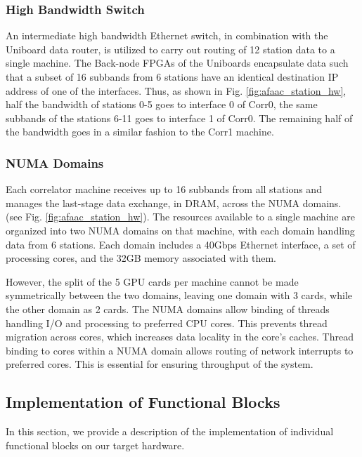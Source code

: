 \documentclass{ws-jai}
\begin{document}
\subsubsection  {High  Bandwidth  Switch}
An intermediate high bandwidth Ethernet switch, in combination with the Uniboard
data router,  is utilized to carry  out routing of  12 station data to  a single
machine.  The  Back-node FPGAs  of the  Uniboards encapsulate  data such  that a
subset of 16  subbands from 6 stations have an  identical destination IP address
of one of  the interfaces.  Thus, as shown  in Fig.  \ref{fig:afaac_station_hw},
half  the bandwidth  of stations  0-5 goes  to interface  0 of  Corr0, the  same
subbands of the stations 6-11 goes to  interface 1 of Corr0.  The remaining half
of the bandwidth goes in a similar fashion to the Corr1 machine.\\

\subsubsection  {NUMA  Domains}
Each correlator machine receives up to 16 subbands from all stations and manages
the  last-stage  data  exchange,  in   DRAM,  across  the  NUMA  domains.   (see
Fig. \ref{fig:afaac_station_hw}).   The resources available to  a single machine
are organized into  two NUMA domains on that machine,  with each domain handling
data from 6 stations. Each domain includes a 40Gbps Ethernet interface, a set of
processing cores, and the 32GB memory associated with them.

However, the split of  the 5 GPU cards per machine  cannot be made symmetrically
between the two domains, leaving one domain with 3 cards, while the other domain
as  2  cards.  The  NUMA  domains  allow binding  of  threads  handling I/O  and
processing to preferred CPU cores.  This prevents thread migration across cores,
which increases  data locality in  the core's  caches.  Thread binding  to cores
within a  NUMA domain allows routing  of network interrupts to  preferred cores.
This is essential for ensuring throughput of the system.

\subsection {Implementation of Functional  Blocks} 

In this  section, we provide a  description of the implementation  of individual
functional blocks on our target hardware.\\
\end{document}
